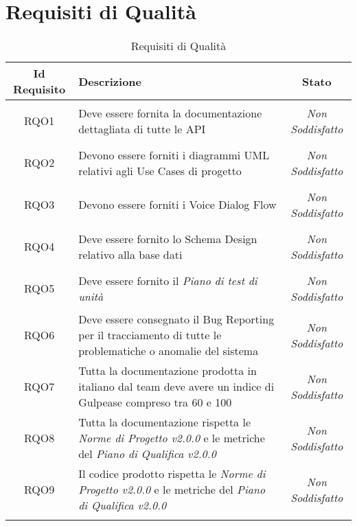 \section{Requisiti di Qualità}
\normalsize
\begin{longtable}{|c|>{\centering}m{7cm}|c|}
	\hline
	\textbf{Id Requisito} & \textbf{Descrizione} & \textbf{Stato}\\
	\hline
	\endhead
	\hypertarget{RQO1}{RQO1} & Deve essere fornita la documentazione dettagliata di tutte le API & {\textit{Non Soddisfatto}}\\ \hline
	
	\hypertarget{RQO2}{RQO2} & Devono essere forniti i diagrammi UML relativi agli Use Cases di progetto & {\textit{Non Soddisfatto}}\\ \hline
	
	\hypertarget{RQO3}{RQO3} & Devono essere forniti i Voice Dialog Flow & {\textit{Non Soddisfatto}}\\ \hline
	
	\hypertarget{RQO4}{RQO4} & Deve essere fornito lo Schema Design relativo alla base dati & {\textit{Non Soddisfatto}}\\ \hline
	
	\hypertarget{RQO5}{RQO5} & Deve essere fornito il \textit{Piano di test di unità} & {\textit{Non Soddisfatto}}\\ \hline
	
	\hypertarget{RQO6}{RQO6} & Deve essere consegnato il Bug Reporting per il tracciamento di tutte le problematiche o anomalie del sistema & {\textit{Non Soddisfatto}}\\ \hline
	
	\hypertarget{RQO7}{RQO7} & Tutta la documentazione prodotta in italiano dal team deve avere un indice di Gulpease compreso tra 60 e 100 & {\textit{Non Soddisfatto}}\\ \hline
	
	\hypertarget{RQO8}{RQO8} & Tutta la documentazione rispetta le \textit{Norme di Progetto v2.0.0} e le metriche del \textit{Piano di Qualifica v2.0.0} & {\textit{Non Soddisfatto}}\\ \hline
	
	\hypertarget{RQO9}{RQO9} & Il codice prodotto rispetta le \textit{Norme di Progetto v2.0.0} e le metriche del \textit{Piano di Qualifica v2.0.0} & {\textit{Non Soddisfatto}}\\ \hline
	
	\caption[Requisiti di Qualità]{Requisiti di Qualità}
	\label{tabella:req2}
\end{longtable}
\clearpage
